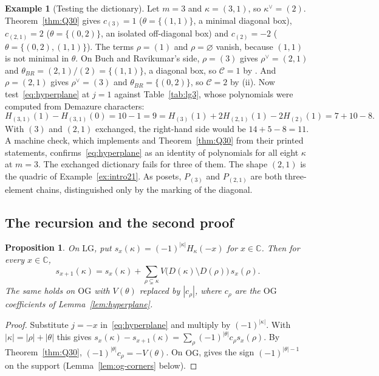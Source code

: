 \documentclass[11pt]{amsart}
\newtheorem{proposition}[theorem]{Proposition}
\theoremstyle{definition}
\newtheorem{example}[theorem]{Example}
\theoremstyle{remark}
\newcommand{\LG}{\mathrm{LG}}
\newcommand{\OG}{\mathrm{OG}}
\newcommand{\cC}{\mathcal{C}}
\newcommand{\C}{\mathbb{C}}
\begin{document}
\begin{example}[Testing the dictionary]\label{ex:dict31}
Let $m=3$ and $\kappa=(3,1)$, so $\kappa^\vee=(2)$. Theorem~\ref{thm:Q30} gives
$c_{(3)}=1$ ($\theta=\{(1,1)\}$, a minimal diagonal box), $c_{(2,1)}=2$ ($\theta=\{(0,2)\}$, an
isolated off-diagonal box) and $c_{(2)}=-2$ ($\theta=\{(0,2),(1,1)\}$). The terms $\rho=(1)$ and
$\rho=\varnothing$ vanish, because $(1,1)$ is not minimal in $\theta$. On Buch and Ravikumar's
side, $\rho=(3)$ gives $\rho^\vee=(2,1)$ and $\theta_{BR}=(2,1)/(2)=\{(1,1)\}$, a diagonal box, so
$\cC=1$ by \cite[Thm.~5.5(i)]{BR12}. And $\rho=(2,1)$ gives $\rho^\vee=(3)$ and
$\theta_{BR}=\{(0,2)\}$, so $\cC=2$ by (ii). Now test~\eqref{eq:hyperplane} at $j=1$ against
Table~\ref{tab:lg3}, whose polynomials were computed from Demazure characters:
\[ H_{(3,1)}(1)-H_{(3,1)}(0)=10-1=9=H_{(3)}(1)+2H_{(2,1)}(1)-2H_{(2)}(1)=7+10-8. \]
With $(3)$ and $(2,1)$ exchanged, the right-hand side would be $14+5-8=11$. A machine check,
which implements \cite[Thm.~5.5]{BR12} and Theorem~\ref{thm:Q30} from their printed statements,
confirms~\eqref{eq:hyperplane} as an identity of polynomials for all eight $\kappa$ at $m=3$. The
exchanged dictionary fails for three of them.
The shape $(2,1)$ is the quadric of Example~\ref{ex:intro21}. As posets, $P_{(3)}$ and
$P_{(2,1)}$ are both three-element chains, distinguished only by the marking of the diagonal.
\end{example}

\subsection{The recursion and the second proof}

\begin{proposition}\label{prop:star}
On $\LG$, put $s_x(\kappa)=(-1)^{|\kappa|}H_\kappa(-x)$ for $x\in\C$. Then for every $x\in\C$,
\begin{equation}\label{eq:star}
s_{x+1}(\kappa)=s_x(\kappa)+\sum_{\rho\subsetneq\kappa}V\bigl(D(\kappa)\setminus D(\rho)\bigr)\,s_x(\rho).
\end{equation}
The same holds on $\OG$ with $V(\theta)$ replaced by $|c_\rho|$, where $c_\rho$ are the $\OG$
coefficients of Lemma~\ref{lem:hyperplane}.
\end{proposition}

\begin{proof}
Substitute $j=-x$ in~\eqref{eq:hyperplane} and multiply by $(-1)^{|\kappa|}$. With
$|\kappa|=|\rho|+|\theta|$ this gives
$s_x(\kappa)-s_{x+1}(\kappa)=\sum_\rho(-1)^{|\theta|}c_\rho s_x(\rho)$. By
Theorem~\ref{thm:Q30}, $(-1)^{|\theta|}c_\rho=-V(\theta)$. On $\OG$, \cite[Lemma~4.5]{BR12}
gives the sign $(-1)^{|\theta|-1}$ on the support (Lemma~\ref{lem:og-corners} below).
\end{proof}
\end{document}
